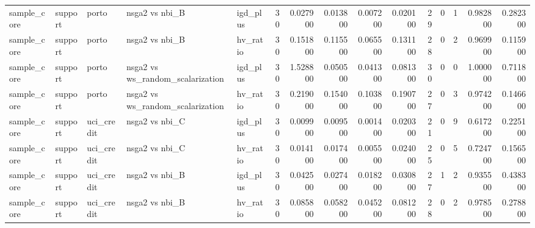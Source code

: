 \begin{landscape}
\begin{longtable}{lllllrrrrrrrrrr}
sample\_core & support & porto & nsga2 vs nbi\_B & igd\_plus & 30 & 0.027900 & 0.013800 & 0.007200 & 0.020100 & 29 & 0 & 1 & 0.982800 & 0.282300 \\
sample\_core & support & porto & nsga2 vs nbi\_B & hv\_ratio & 30 & 0.151800 & 0.115500 & 0.065500 & 0.131100 & 28 & 0 & 2 & 0.969900 & 0.115900 \\
sample\_core & support & porto & nsga2 vs ws\_random\_scalarization & igd\_plus & 30 & 1.528800 & 0.050500 & 0.041300 & 0.081300 & 30 & 0 & 0 & 1.000000 & 0.711800 \\
sample\_core & support & porto & nsga2 vs ws\_random\_scalarization & hv\_ratio & 30 & 0.219000 & 0.154000 & 0.103800 & 0.190700 & 27 & 0 & 3 & 0.974200 & 0.146600 \\
sample\_core & support & uci\_credit & nsga2 vs nbi\_C & igd\_plus & 30 & 0.009900 & 0.009500 & 0.001400 & 0.020300 & 21 & 0 & 9 & 0.617200 & 0.225100 \\
sample\_core & support & uci\_credit & nsga2 vs nbi\_C & hv\_ratio & 30 & 0.014100 & 0.017400 & 0.005500 & 0.024000 & 25 & 0 & 5 & 0.724700 & 0.156500 \\
sample\_core & support & uci\_credit & nsga2 vs nbi\_B & igd\_plus & 30 & 0.042500 & 0.027400 & 0.018200 & 0.030800 & 27 & 1 & 2 & 0.935500 & 0.438300 \\
sample\_core & support & uci\_credit & nsga2 vs nbi\_B & hv\_ratio & 30 & 0.085800 & 0.058200 & 0.045200 & 0.081200 & 28 & 0 & 2 & 0.978500 & 0.278800 \\
\end{longtable}\endgroup

\end{landscape}
